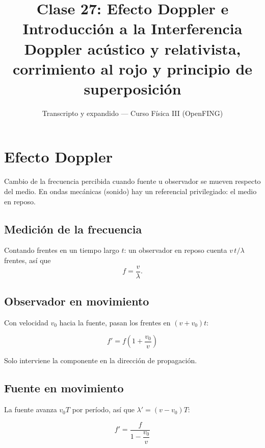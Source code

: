 \documentclass[12pt,a4paper]{article}
\title{\textbf{Clase 27: Efecto Doppler e Introducción a la Interferencia}\\[0.3em]
        \large{Doppler acústico y relativista, corrimiento al rojo y
              principio de superposición}}
\author{Transcripto y expandido --- Curso Física III (OpenFING)}
\date{}
\begin{document}
\maketitle
\thispagestyle{empty}
\newpage

\tableofcontents
\newpage

\section{Efecto Doppler}

Cambio de la frecuencia percibida cuando fuente u observador se mueven respecto
del medio. En ondas mecánicas (sonido) hay un referencial privilegiado: el
medio en reposo.

\subsection{Medición de la frecuencia}

Contando frentes en un tiempo largo $t$: un observador en reposo cuenta
$v\,t/\lambda$ frentes, así que
\[
f = \frac{v}{\lambda}.
\]

\subsection{Observador en movimiento}

Con velocidad $v_0$ hacia la fuente, pasan los frentes en $(v+v_0)t$:

\begin{keybox}
  \[
  \boxed{f' = f\left(1 + \frac{v_0}{v}\right)}
  \]
\end{keybox}

Solo interviene la componente en la dirección de propagación.



\subsection{Fuente en movimiento}

La fuente avanza $v_0 T$ por período, así que $\lambda' = (v - v_0)T$:

\begin{keybox}
  \[
  \boxed{f' = \frac{f}{1 - \dfrac{v_0}{v}}}
  \]
\end{keybox}
\end{document}

